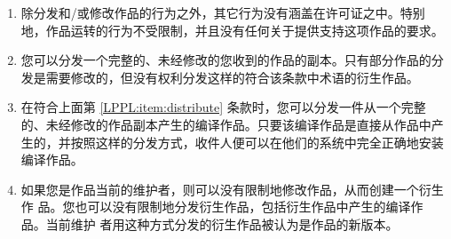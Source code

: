 \begin{LPPLicense}
    \begin{enumerate}
        \item 除分发和/或修改作品的行为之外，其它行为没有涵盖在许可证之中。特别地，作品运转的行为不受限制，并且没有任何关于提供支持这项作品的要求。
        \item\label{LPPL:item:distribute} 您可以分发一个完整的、未经修改的您收到的作品的副本。只有部分作品的分发是需要修改的，但没有权利分发这样的符合该条款中术语的衍生作品。
        \item 在符合上面第 \ref{LPPL:item:distribute} 条款时，您可以分发一件从一个完整的、未经修改的作品副本产生的编译作品。只要该编译作品是直接从作品中产生的，并按照这样的分发方式，收件人便可以在他们的系统中完全正确地安装编译作品。
        \item\label{LPPL:item:currmaint} 如果您是作品当前的维护者，则可以没有限制地修改作品，从而创建一个衍生作 品。您也可以没有限制地分发衍生作品，包括衍生作品中产生的编译作品。当前维护 者用这种方式分发的衍生作品被认为是作品的新版本。

\end{enumerate}
\end{LPPLicense}
